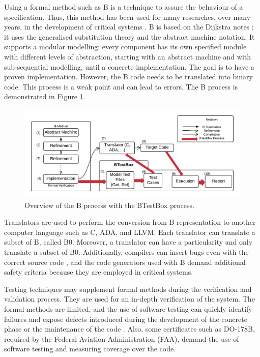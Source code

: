\documentclass[runningheads]{llncs}
\begin{document}
Using a formal method such as B is a technique to assure the behaviour of a specification.
Thus, this method has been used for many researches, over many years, in the development of critical systems \cite{valerio_thesis:2016}. B is based on the Dijkstra notes \cite{dijkstra1976discipline}; it uses the generalised substitution theory \cite{hoare2002proof} and the abstract machine notation. It supports a modular modelling:  every component has its own specified module with different levels of abstraction, starting with an abstract machine and with sub-sequential modelling, until a concrete implementation. The goal is to have a proven implementation. However, the B code needs to be translated into binary code. This process is a weak point and can lead to errors. The B process is demonstrated in Figure \ref{fig:Bmethod}.

\begin{figure}[ht]
    \centering
    \includegraphics[width = \textwidth,natwidth=1240,natheight=513]{imagens/BMethodBTestBoxColor.png}
    \caption{Overview of the B process with the BTestBox process.}
    \label{fig:Bmethod}
\end{figure}

Translators are used to perform the conversion from B representation to another computer language such as C, ADA, and LLVM. Each translator can translate a subset of B, called B0. Moreover, a translator can have a particularity and only translate a subset of B0. %
Additionally, compilers can insert bugs even with the correct source code \cite{leroy2009formal}, and the code generators used with B demand additional safety criteria because they are employed in critical systems.

Testing techniques may supplement formal methods during the verification and validation process. They are used for an in-depth verification of the system. The formal methods are limited, and the use of software testing can quickly identify failures and expose defects introduced during the development of the concrete phase or the maintenance of the code \cite{ernesto_thesis:2016}. Also, some certificates such as DO-178B, required by the Federal Aviation Administration (FAA), demand the use of software testing and measuring coverage over the code.
\end{document}
